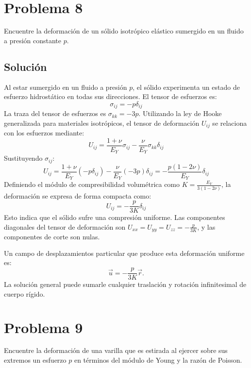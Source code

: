 \documentclass[a4paper]{article}
\begin{document}
\section{Problema 8}

Encuentre la deformación de un sólido isotrópico elástico sumergido en un fluido a presión constante $p$.

\subsection{Solución}
Al estar sumergido en un fluido a presión $p$, el sólido experimenta un estado de esfuerzo hidrostático en todas sus direcciones. El tensor de esfuerzos es:
$$ \sigma_{ij} = -p \delta_{ij} $$
La traza del tensor de esfuerzos es $\sigma_{kk} = -3p$.
Utilizando la ley de Hooke generalizada para materiales isotrópicos, el tensor de deformación $U_{ij}$ se relaciona con los esfuerzos mediante:
$$ U_{ij} = \frac{1+\nu}{E_Y} \sigma_{ij} - \frac{\nu}{E_Y} \sigma_{kk} \delta_{ij} $$
Sustituyendo $\sigma_{ij}$:
$$ U_{ij} = \frac{1+\nu}{E_Y} (-p \delta_{ij}) - \frac{\nu}{E_Y} (-3p) \delta_{ij} = -\frac{p(1-2\nu)}{E_Y} \delta_{ij} $$
Definiendo el módulo de compresibilidad volumétrica como $K = \frac{E_Y}{3(1-2\nu)}$, la deformación se expresa de forma compacta como:
$$ U_{ij} = -\frac{p}{3K} \delta_{ij} $$
Esto indica que el sólido sufre una compresión uniforme. Las componentes diagonales del tensor de deformación son $U_{xx} = U_{yy} = U_{zz} = -\frac{p}{3K}$, y las componentes de corte son nulas.

Un campo de desplazamientos particular que produce esta deformación uniforme es:
$$ \vec{u} = -\frac{p}{3K}\vec{r}. $$
La solución general puede sumarle cualquier traslación y rotación infinitesimal de cuerpo rígido.

\section{Problema 9}

Encuentre la deformación de una varilla que es estirada al ejercer sobre sus extremos un esfuerzo $p$ en términos del módulo de Young y la razón de Poisson.
\end{document}
